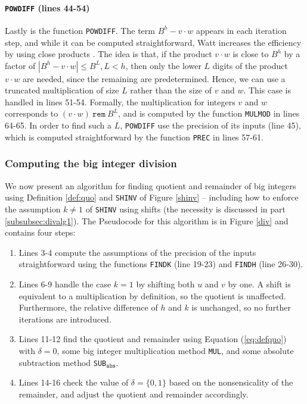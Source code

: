\paragraph{\texttt{POWDIFF} (lines 44-54)}
Lastly is the function \texttt{POWDIFF}. The term $B^h-v \cdot w$ appears in each
iteration step, and while it can be computed straightforward, Watt increases the
efficiency by using close products \cite{watt2023efficient}. The idea is that,
if the product $v\cdot w$ is close to $B^h$ by a factor of
$|B^h- v\cdot w|\leq B^L, L < h$, then only the lower $L$ digits of the product
$v \cdot w$ are needed, since the remaining are predetermined. Hence, we can use a
truncated multiplication of size $L$ rather than the size of $v$ and $w$. This
case is handled in lines 51-54. Formally, the multiplication for integers $v$
and $w$ corresponds to $(v \cdot w)~ \mathtt{rem}~B^L$, and is computed by the
function \texttt{MULMOD} in lines 64-65. In order to find such a $L$,
\texttt{POWDIFF} use the precision of its inputs (line 45), which is computed
straightforward by the function \texttt{PREC} in lines 57-61.

\subsubsection{Computing the big integer division}\label{subsubsec:divalg2}

We now present an algorithm for finding quotient and remainder of big integers
using Definition \ref{def:quo} and \texttt{SHINV} of Figure \ref{shinv} --
including how to enforce the assumption $k\neq 1$ of \texttt{SHINV} using shifts
(the necessity is discussed in part \ref{subsubsec:divalg1}). The Pseudocode for
this algorithm is in Figure \ref{div} and contains four steps:
\begin{enumerate}
\item Lines 3-4 compute the assumptions of the precision of the inputs
  straightforward using the functions \texttt{FINDK} (line 19-23) and
  \texttt{FINDH} (line 26-30).
\item Lines 6-9 handle the case $k=1$ by shifting both $u$ and $v$ by one. A
  shift is equivalent to a multiplication by definition, so the quotient is
  unaffected. Furthermore, the relative difference of $h$ and $k$ is unchanged,
  so no further iterations are introduced.
\item Lines 11-12 find the quotient and remainder using Equation
  (\ref{eq:defquo}) with $\delta=0$, some big integer multiplication method
  \texttt{MUL}, and some absolute subtraction method
  \texttt{SUB}$_{\mathtt{abs}}$.
\item Lines 14-16 check the value of $\delta = \{0,1\}$ based on the nonsensicality
  of the remainder, and adjust the quotient and remainder accordingly.
\end{enumerate}

